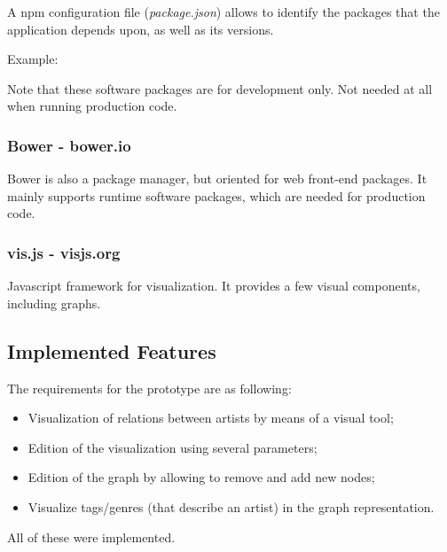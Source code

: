       A npm configuration file (\emph{package.json}) allows to identify the packages that the application depends upon, as well as its versions.

      Example: 

      

      Note that these software packages are for development only. Not needed at all when running production code.

    \subsubsection{Bower - bower.io} %
    \label{ssub:bower}
    
    Bower is also a package manager, but oriented for web front-end packages.
    It mainly supports runtime software packages, which are needed for production code.


    \subsubsection{vis.js - visjs.org} %
    \label{ssub:visjs}
      Javascript framework for visualization.
      It provides a few visual components, including graphs.


  \subsection{Implemented Features} %
    \label{sub:main_features}
    
    The requirements for the prototype are as following:

    \begin{itemize}
      \item Visualization of relations between artists by means of a visual tool;
      \item Edition of the visualization using several parameters;
      \item Edition of the graph by allowing to remove and add new nodes;
      \item Visualize tags/genres (that describe an artist) in the graph representation.
    \end{itemize}

    All of these were implemented.

